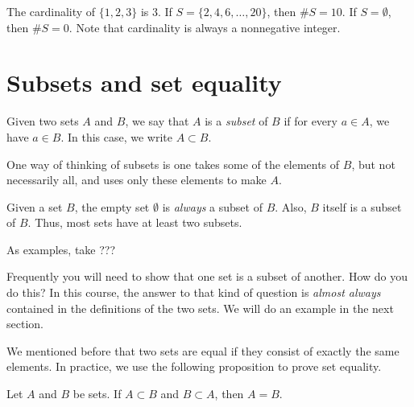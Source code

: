 \documentclass{tufte-book}
\begin{document}
The cardinality of $\{1, 2, 3\}$ is 3. If $S = \{2, 4, 6, \dots, 20\}$, then $\# S = 10$. If $S = \emptyset$, then $\# S = 0$. Note that cardinality is always a nonnegative integer. 



\section{Subsets and set equality}
\label{sec:subsets}

\begin{definition}
  Given two sets $A$ and $B$, we say that $A$ is a \emph{subset}  of $B$ if for every $a \in A$, we have $a \in B$. In this case, we write $A \subset B$. 
\end{definition}
One way of thinking of subsets is one takes some of the elements of $B$, but not necessarily all, and uses only these elements to make $A$.

Given a set $B$, the empty set $\emptyset$ is \emph{always} a subset of $B$. Also, $B$ itself is a subset of $B$. Thus, most sets have at least two subsets.

As examples, take ???

Frequently you will need to show that one set is a subset of another. How do you do this? In this course, the answer to that kind of question is \emph{almost always} contained in the definitions of the two sets. We will do an example in the next section.

We mentioned before that two sets are equal if they consist of exactly the same elements. In practice, we use the following proposition to prove set equality.
\begin{proposition}
  Let $A$ and $B$ be sets. If $A \subset B$ and $B \subset A$, then $A = B$. 
\end{proposition}
\end{document}
